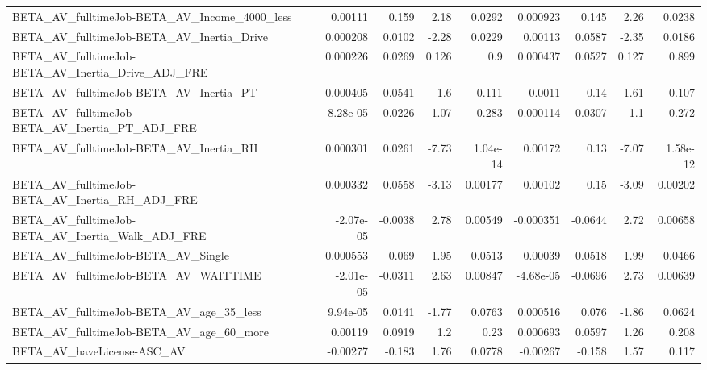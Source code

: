 \begin{tabular}{lrrrrrrrr}
BETA\_AV\_fulltimeJob-BETA\_AV\_Income\_4000\_less       &     0.00111 &        0.159 &     2.18 &   0.0292 &   0.000923 &       0.145 &         2.26 &        0.0238 \\
BETA\_AV\_fulltimeJob-BETA\_AV\_Inertia\_Drive          &    0.000208 &       0.0102 &    -2.28 &   0.0229 &    0.00113 &      0.0587 &        -2.35 &        0.0186 \\
BETA\_AV\_fulltimeJob-BETA\_AV\_Inertia\_Drive\_ADJ\_FRE  &    0.000226 &       0.0269 &    0.126 &      0.9 &   0.000437 &      0.0527 &        0.127 &         0.899 \\
BETA\_AV\_fulltimeJob-BETA\_AV\_Inertia\_PT             &    0.000405 &       0.0541 &     -1.6 &    0.111 &     0.0011 &        0.14 &        -1.61 &         0.107 \\
BETA\_AV\_fulltimeJob-BETA\_AV\_Inertia\_PT\_ADJ\_FRE     &    8.28e-05 &       0.0226 &     1.07 &    0.283 &   0.000114 &      0.0307 &          1.1 &         0.272 \\
BETA\_AV\_fulltimeJob-BETA\_AV\_Inertia\_RH             &    0.000301 &       0.0261 &    -7.73 & 1.04e-14 &    0.00172 &        0.13 &        -7.07 &      1.58e-12 \\
BETA\_AV\_fulltimeJob-BETA\_AV\_Inertia\_RH\_ADJ\_FRE     &    0.000332 &       0.0558 &    -3.13 &  0.00177 &    0.00102 &        0.15 &        -3.09 &       0.00202 \\
BETA\_AV\_fulltimeJob-BETA\_AV\_Inertia\_Walk\_ADJ\_FRE   &   -2.07e-05 &      -0.0038 &     2.78 &  0.00549 &  -0.000351 &     -0.0644 &         2.72 &       0.00658 \\
BETA\_AV\_fulltimeJob-BETA\_AV\_Single                 &    0.000553 &        0.069 &     1.95 &   0.0513 &    0.00039 &      0.0518 &         1.99 &        0.0466 \\
BETA\_AV\_fulltimeJob-BETA\_AV\_WAITTIME               &   -2.01e-05 &      -0.0311 &     2.63 &  0.00847 &  -4.68e-05 &     -0.0696 &         2.73 &       0.00639 \\
BETA\_AV\_fulltimeJob-BETA\_AV\_age\_35\_less            &    9.94e-05 &       0.0141 &    -1.77 &   0.0763 &   0.000516 &       0.076 &        -1.86 &        0.0624 \\
BETA\_AV\_fulltimeJob-BETA\_AV\_age\_60\_more            &     0.00119 &       0.0919 &      1.2 &     0.23 &   0.000693 &      0.0597 &         1.26 &         0.208 \\
BETA\_AV\_haveLicense-ASC\_AV                         &    -0.00277 &       -0.183 &     1.76 &   0.0778 &   -0.00267 &      -0.158 &         1.57 &         0.117 \\

\end{tabular}
